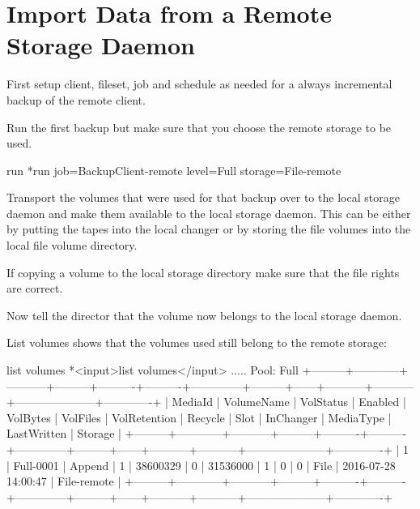 \section{Import Data from a Remote Storage Daemon}


First setup client, fileset, job and schedule as needed for a always incremental backup of the remote client.


Run the first backup but make sure that you choose the remote storage to be used.


\begin{bconsole}{run}
*run job=BackupClient-remote level=Full storage=File-remote
\end{bconsole}



Transport the volumes that were used for that backup over to the local storage daemon and make them available to the local storage daemon.
This can be either by putting the tapes into the local changer or by storing the file volumes into the local file volume directory.

If copying a volume to the local storage directory make sure that the file rights are correct.

Now tell the director that the volume now belongs to the local storage daemon.

List volumes shows that the volumes used still belong to the remote storage:

\begin{bconsole}{list volumes}
*<input>list volumes</input>
.....
Pool: Full
+---------+------------+-----------+---------+----------+----------+--------------+---------+------+-----------+-----------+---------------------+-------------+
| MediaId | VolumeName | VolStatus | Enabled | VolBytes | VolFiles | VolRetention | Recycle | Slot | InChanger | MediaType | LastWritten         | Storage     |
+---------+------------+-----------+---------+----------+----------+--------------+---------+------+-----------+-----------+---------------------+-------------+
| 1       | Full-0001  | Append    | 1       | 38600329 | 0        | 31536000     | 1       | 0    | 0         | File      | 2016-07-28 14:00:47 | File-remote |
+---------+------------+-----------+---------+----------+----------+--------------+---------+------+-----------+-----------+---------------------+-------------+
\end{bconsole}

